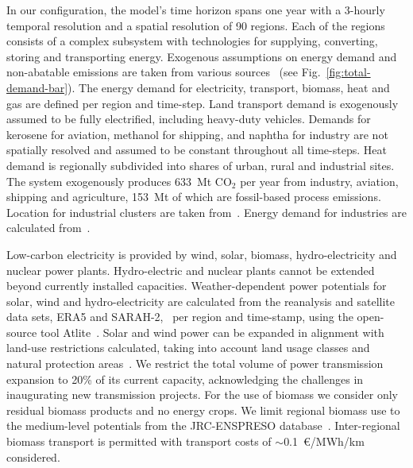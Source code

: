 \documentclass[twocolumn]{article}
\newcommand{\COtwo}{CO$_2$}
\begin{document}
%
In our configuration, the model's time horizon spans one year with a 3-hourly temporal resolution and a spatial resolution of 90 regions. Each of the regions consists of a complex subsystem with technologies for supplying, converting, storing and transporting energy. Exogenous assumptions on energy demand and non-abatable emissions are taken from various sources~\cite{piamanzGeoreferencedIndustrialSites2018,muehlenpfordtTimeSeries2019,mantzosJRCIDEES20152018,NationalEmissionsReported2023,EurostatCompleteEnergyBalance,uwekrienDemandlib2023} (see Fig.~\ref{fig:total-demand-bar}). The energy demand for electricity, transport, biomass, heat and gas are defined per region and time-step.
Land transport demand is exogenously assumed to be fully electrified, including heavy-duty vehicles.
Demands for kerosene for aviation, methanol for shipping, and naphtha for industry are not spatially resolved and assumed to be constant throughout all time-steps.
Heat demand is regionally subdivided into shares of urban, rural and industrial sites.
The system exogenously produces 633~Mt \COtwo{} per year from industry, aviation, shipping and agriculture, 153~Mt of which are fossil-based process emissions.
Location for industrial clusters are taken from~\cite{hotmaps_industrial_db}. Energy demand for industries are calculated from~\cite{mantzosJRCIDEES20152018}.


Low-carbon electricity is provided by wind, solar, biomass, hydro-electricity and nuclear power plants. Hydro-electric and nuclear plants cannot be extended beyond currently installed capacities. Weather-dependent power potentials for solar, wind and hydro-electricity are calculated from the reanalysis and satellite data sets, ERA5 and SARAH-2,~\cite{hersbachERA5GlobalReanalysis2020,pfeifrothSurfaceRadiationData2017} per region and time-stamp, using the open-source tool Atlite~\cite{hofmannAtliteLightweightPython2021}.
Solar and wind power can be expanded in alignment with land-use restrictions calculated, taking into account land usage classes and natural protection areas~\cite{eeaCorineLandCover2012,eeaNatura2000Data2016}. We restrict the total volume of power transmission expansion to 20\% of its current capacity, acknowledging the challenges in inaugurating new transmission projects.
For the use of biomass we consider only residual biomass products and no energy crops. We limit regional biomass use to the medium-level potentials from the JRC-ENSPRESO database~\cite{enspreso_database,instituteforenergyandtransportjointresearchcentreJRCEUTIMESModelBioenergy2015}. Inter-regional biomass transport is permitted with transport costs of $\sim$0.1~€/MWh/km considered.
\end{document}

